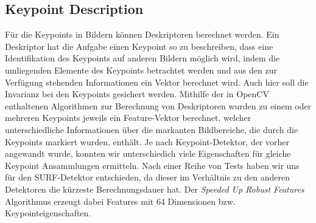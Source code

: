 \documentclass{scrartcl}
\begin{document}
\subsection{Keypoint Description}
Für die Keypoints in Bildern können Deskriptoren berechnet werden. Ein Deskriptor hat die Aufgabe einen Keypoint so zu beschreiben, dass eine Identifikation des Keypoints auf anderen Bildern möglich wird, indem die umliegenden Elemente des Keypoints betrachtet werden und aus den zur Verfügung stehenden Informationen ein Vektor berechnet wird. Auch hier soll die Invarianz bei den Keypoints gesichert werden. Mithilfe der in OpenCV enthaltenen Algorithmen zur Berechnung von Deskriptoren wurden zu einem oder mehreren Keypoints jeweils ein Feature-Vektor berechnet, welcher unterschiedliche Informationen über die markanten Bildbereiche, die durch die Keypoints markiert wurden, enthält. Je nach Keypoint-Detektor, der vorher angewandt wurde, konnten wir unterschiedich viele Eigenschaften für gleiche Keypoint Ansammlungen ermitteln. Nach einer Reihe von Tests haben wir uns für den SURF-Detektor entschieden, da dieser im Verhältnis zu den anderen Detektoren die kürzeste Berechnungsdauer hat. Der \textit{Speeded Up Robust Features} Algorithmus erzeugt dabei Features mit 64 Dimensionen bzw. Keypointeigenschaften. 
\end{document}
